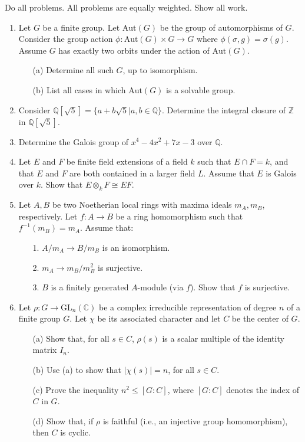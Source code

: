 \documentclass{article}
\begin{document}
Do all problems. All problems are equally weighted. Show all work.

\begin{enumerate}
    \item Let \(G\) be a finite group. Let \(\text{Aut}(G)\) be the group of automorphisms of \(G\). Consider the group action \(\phi : \text{Aut}(G) \times G \to G\) where \(\phi(\sigma, g) = \sigma(g)\). Assume \(G\) has exactly two orbits under the action of \(\text{Aut}(G)\).
    \begin{itemize}
        \item[(a)] Determine all such \(G\), up to isomorphism.
        \item[(b)] List all cases in which \(\text{Aut}(G)\) is a solvable group.
    \end{itemize}

    \item Consider \(\mathbb{Q}[\sqrt{5}] = \{a + b\sqrt{5}|a,b \in \mathbb{Q}\}\). Determine the integral closure of \(\mathbb{Z}\) in \(\mathbb{Q}[\sqrt{5}]\).

    \item Determine the Galois group of \(x^4 - 4x^2 + 7x - 3\) over \(\mathbb{Q}\).

    \item Let \(E\) and \(F\) be finite field extensions of a field \(k\) such that \(E \cap F = k\), and that \(E\) and \(F\) are both contained in a larger field \(L\). Assume that \(E\) is Galois over \(k\). Show that \(E \otimes_k F \cong EF\).

    \item Let \(A, B\) be two Noetherian local rings with maxima ideals \(m_A, m_B\), respectively. Let \(f : A \to B\) be a ring homomorphism such that \(f^{-1}(m_B) = m_A\). Assume that:
    \begin{itemize}
        \item[1.] \(A/m_A \to B/m_B\) is an isomorphism.
        \item[2.] \(m_A \to m_B/m_B^2\) is surjective.
        \item[3.] \(B\) is a finitely generated \(A\)-module (via \(f\)). Show that \(f\) is surjective.
    \end{itemize}

    \item Let \(\rho : G \to \text{GL}_n(\mathbb{C})\) be a complex irreducible representation of degree \(n\) of a finite group \(G\). Let \(\chi\) be its associated character and let \(C\) be the center of \(G\).
    \begin{itemize}
        \item[(a)] Show that, for all \(s \in C\), \(\rho(s)\) is a scalar multiple of the identity matrix \(I_n\).
        \item[(b)] Use (a) to show that \(|\chi(s)| = n\), for all \(s \in C\).
        \item[(c)] Prove the inequality \(n^2 \leq [G : C]\), where \([G : C]\) denotes the index of \(C\) in \(G\).
        \item[(d)] Show that, if \(\rho\) is faithful (i.e., an injective group homomorphism), then \(C\) is cyclic.
    \end{itemize}
\end{enumerate}
\end{document}
